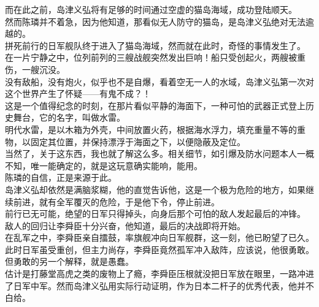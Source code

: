 \begin{multicols}{\theparacolNo}
而在此之前，岛津义弘将有足够的时间通过空虚的猫岛海域，成功登陆顺天。\\

然而陈璘并不着急，因为他知道，那看似无人防守的猫岛，是岛津义弘绝对无法逾越的。\\

拼死前行的日军舰队终于进入了猫岛海域，然而就在此时，奇怪的事情发生了。\\

在一片宁静之中，位列前列的三艘战舰突然发出巨响！船只受创起火，两艘被重伤，一艘沉没。\\

没有敌船，没有炮火，似乎也不是自爆，看着空无一人的水域，岛津义弘第一次对这个世界产生了怀疑——有鬼不成？！\\

这是一个值得纪念的时刻，在那片看似平静的海面下，一种可怕的武器正式登上历史舞台，它的名字，叫做水雷。\\

明代水雷，是以木箱为外壳，中间放置火药，根据海水浮力，填充重量不等的重物，以固定其位置，并保持漂浮于海面之下，以便隐蔽及定位。\\

当然了，关于这东西，我也就了解这么多。相关细节，如引爆及防水问题本人一概不知，唯一能确定的，就是这玩意确实能响，能用。\\

陈璘的自信，正是来源于此。\\

岛津义弘却依然是满脑浆糊，他的直觉告诉他，这是一个极为危险的地方，如果继续前进，就有全军覆灭的危险，于是他下令，停止前进。\\

前行已无可能，绝望的日军只得掉头，向身后那个可怕的敌人发起最后的冲锋。\\

敌人的回归让李舜臣十分兴奋，他知道，最后的决战即将开始。\\

在乱军之中，李舜臣亲自擂鼓，率旗舰冲向日军舰群，这一刻，他已盼望了已久。\\

此时日军虽受重创，但主力尚存，李舜臣竟然孤军冲入敌阵，应该说，他很勇敢。但勇敢的另一个解释，就是愚蠢。\\

估计是打藤堂高虎之类的废物上了瘾，李舜臣压根就没把日军放在眼里，一路冲进了日军中军。然而岛津义弘用实际行动证明，作为日本二杆子的优秀代表，他并不白给。\\


\end{multicols}
